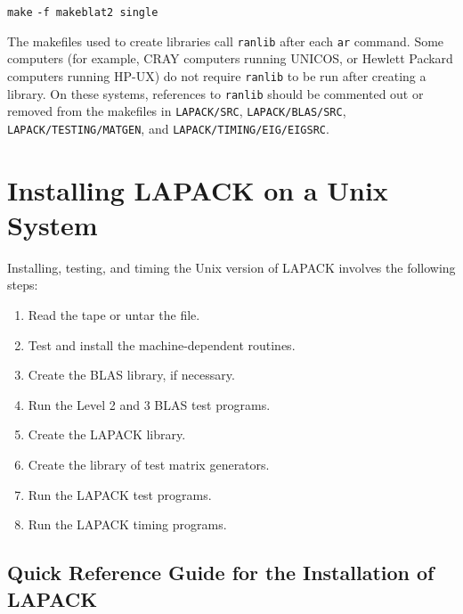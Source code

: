 \begin{list}{}{}
\item{{\tt make}} {\tt -f makeblat2 single}
\end{list}

The makefiles used to create libraries call {\tt ranlib} after each
{\tt ar} command. 
Some computers (for example, CRAY computers running UNICOS, or Hewlett 
Packard computers running HP-UX)
do not require {\tt ranlib} to be run after creating a library. 
On these systems,
references to {\tt ranlib} should be commented out or removed
from the makefiles in {\tt LAPACK/SRC}, {\tt LAPACK/BLAS/SRC}, 
{\tt LAPACK/TESTING/MATGEN}, and {\tt LAPACK/TIMING/EIG/EIGSRC}.


\section{Installing LAPACK on a Unix System}

Installing, testing, and timing the Unix version of LAPACK
involves the following steps: 
\begin{enumerate}
\item Read the tape or untar the file.

\item Test and install the machine-dependent routines.

\item Create the BLAS library, if necessary. 

\item Run the Level 2 and 3 BLAS test programs.

\item Create the LAPACK library.

\item Create the library of test matrix generators.

\item Run the LAPACK test programs.

\item Run the LAPACK timing programs.
%
\end{enumerate}
%
%
\subsection*{Quick Reference Guide for the Installation of LAPACK}
\dent

